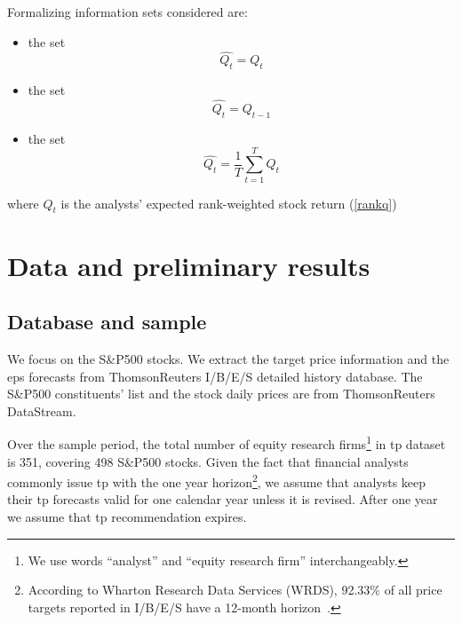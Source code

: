 \documentclass[a4paper,twoside,12pt,openright,notitlepage]{report}\usepackage[]{graphicx}\usepackage[]{color}
\begin{document}
Formalizing information sets considered are:
\begin{itemize}
\item  the \tr{} set%
\begin{equation}
\label{q:true}
\widehat{Q_{t}}=Q_{t}
\end{equation}

\item  the \naive{} set %
\begin{equation}
\label{q:naive}
\widehat{Q_{t}}=Q_{t-1}
\end{equation}

\item  the   set%
\begin{equation}
\label{q:default}
\widehat{Q_{t}} = \frac{1}{T} \sum_{t=1}^{T} Q_{t}
\end{equation}
\end{itemize}
where $Q_{t}$ is the analysts' expected rank-weighted stock return (\ref{rankq})

\section{Data and preliminary results}
\label{ch1-sec:rankings}

\subsection{Database and sample}
We focus on the  S\&P500 stocks. We extract the target price information and the \gls{eps} forecasts from ThomsonReuters  I/B/E/S detailed history database. The  S\&P500 constituents' list and the stock daily prices are from ThomsonReuters DataStream.


Over the sample period, the total number of equity research firms\footnote{We use words ``analyst'' and ``equity research firm'' interchangeably.} in \gls{tp} dataset is 351, covering 498 S\&P500 stocks. Given the fact that financial analysts commonly issue \gls{tp} with the one year horizon\footnote{According to Wharton Research Data Services (WRDS), 92.33\% of all price targets reported in I/B/E/S have a 12-month horizon~\citep{glushkov2009}.}, we assume that analysts keep their \gls{tp} forecasts valid for one calendar year unless it is revised. After one year we assume that \gls{tp} recommendation expires.
\end{document}
